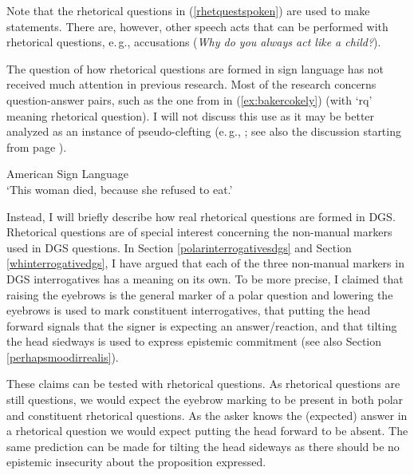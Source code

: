 \noindent Note that the rhetorical questions in (\ref{rhetquestspoken}) are used to make statements. There are, however, other speech acts that can be performed with rhetorical questions, e.\,g.,  accusations (\textit{Why do you always act like a child?}). 

The question of how rhetorical questions are formed in sign language has not received much attention in previous research. Most of the research concerns question-answer pairs, such as the one from \citet[138]{baker1980american} in (\ref{ex:bakercokely}) (with `rq' meaning rhetorical question). I will not discuss this use as it may be better analyzed as an instance of pseudo-clefting (e.\,g., \citealt{wilbur1996evidence}; see also the discussion starting from page \pageref{pseudocleeeeefts}).%

\begin{exe}
\ex American Sign Language\\   
\glt `This woman died, because she refused to eat.' \label{ex:bakercokely} 
\end{exe}

\noindent Instead, I will briefly describe how real rhetorical questions are formed in DGS. Rhetorical questions are of special interest concerning the non-manual markers used in DGS questions. In Section \ref{polarinterrogativesdgs} and Section \ref{whinterrogativedgs}, I have argued that each of the three non-manual markers in DGS interrogatives has a meaning on its own. To be more precise, I claimed that raising the eyebrows is the general marker of a polar question and lowering the eyebrows is used to mark constituent interrogatives, that putting the head forward signals that the signer is expecting an answer/reaction, and that tilting the head siedways is used to express epistemic commitment (see also Section \ref{perhapsmoodirrealis}). 

These claims can be tested with rhetorical questions. As rhetorical questions are still questions, we would expect the eyebrow marking to be present in both polar and constituent rhetorical questions. As the asker knows the (expected) answer in a rhetorical question we would expect putting the head forward to be absent. The same prediction can be made for tilting the head sideways as there should be no epistemic insecurity about the proposition expressed. 

